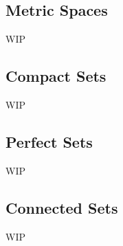 \documentclass[../poma-notes.tex]{subfiles}
\begin{document}
\subsection*{Metric Spaces}

WIP

\subsection*{Compact Sets}

WIP

\subsection*{Perfect Sets}

WIP

\subsection*{Connected Sets}

WIP
\end{document}
